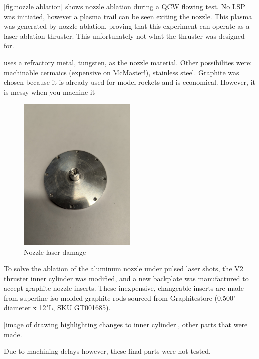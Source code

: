     \autoref{fig:nozzle ablation} shows nozzle ablation during a QCW flowing test. No LSP was initiated, however a plasma trail can be seen exiting the nozzle. This plasma was generated by nozzle ablation, proving that this experiment can operate as a laser ablation thruster. This unfortunately not what the thruster was designed for. 

    \textcite{toyodaThrustPerformanceCW2002} uses a refractory metal, tungsten, as the nozzle material. Other possibilites were: machinable cermaics (expensive on McMaster!), stainless steel. Graphite was chosen because it is already used for model rockets and is economical. However, it is messy when you machine it 

    \begin{figure}[!ht]
        \centering
        \includegraphics[width=0.5\textwidth]{assets/4 experiments/Nozzle damage.jpg}
        \caption{Nozzle laser damage}
    \end{figure}

    To solve the ablation of the aluminum nozzle under pulsed laser shots, the V2 thruster inner cylinder was modified, and a new backplate was manufactured to accept graphite nozzle inserts. These inexpensive, changeable inserts are made from superfine iso-molded graphite rods sourced from Graphitestore (0.500" diameter x 12"L, SKU GT001685).

    [image of drawing highlighting changes to inner cylinder], other parts that were made.

Due to machining delays however, these final parts were not tested. 


    
